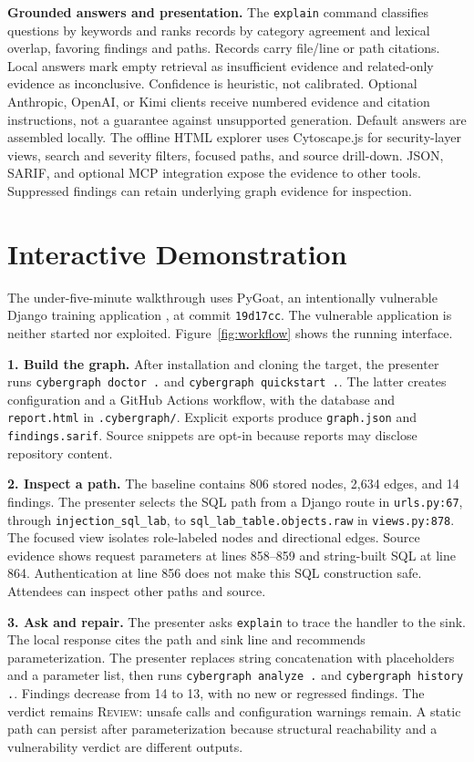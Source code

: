 \documentclass[letterpaper]{article}
\begin{document}
\textbf{Grounded answers and presentation.}
The \texttt{explain} command classifies questions by keywords and ranks records
by category agreement and lexical overlap, favoring findings and paths.
Records carry file/line or path citations. Local answers mark empty retrieval
as insufficient evidence and related-only evidence as inconclusive. Confidence
is heuristic, not calibrated. Optional Anthropic, OpenAI, or Kimi clients
receive numbered evidence and citation instructions, not a guarantee against
unsupported generation. Default answers are assembled locally.
The offline HTML explorer uses Cytoscape.js \citep{franz2016} for security-layer
views, search and severity filters, focused paths, and source drill-down.
JSON, SARIF, and optional MCP integration expose the evidence to other tools.
Suppressed findings can retain underlying graph evidence for inspection.

\section{Interactive Demonstration}
The under-five-minute walkthrough uses PyGoat, an intentionally vulnerable
Django training application \citep{pygoat}, at commit \texttt{19d17cc}.
The vulnerable application is neither started nor exploited.
Figure~\ref{fig:workflow} shows the running interface.

\textbf{1. Build the graph.}
After installation and cloning the target, the presenter runs
\texttt{cybergraph doctor .} and \texttt{cybergraph quickstart .}.
The latter creates configuration and a GitHub Actions workflow,
with the database and \texttt{report.html} in \texttt{.cybergraph/}.
Explicit exports produce \texttt{graph.json} and \texttt{findings.sarif}.
Source snippets are opt-in because reports may disclose repository content.

\textbf{2. Inspect a path.}
The baseline contains 806 stored nodes, 2,634 edges, and 14 findings.
The presenter selects the SQL path from a Django route
in \texttt{urls.py:67}, through \texttt{injection\_sql\_lab}, to
\texttt{sql\_lab\_table.}\allowbreak\texttt{objects.raw} in \texttt{views.py:878}.
The focused view isolates role-labeled nodes and directional edges. Source
evidence shows request parameters at lines
858--859 and string-built SQL at line 864. Authentication at line 856 does not
make this SQL construction safe. Attendees can inspect other paths and source.

\textbf{3. Ask and repair.}
The presenter asks \texttt{explain} to trace the handler to the sink.
The local response cites the path and sink line and recommends parameterization.
The presenter replaces string concatenation with placeholders and a parameter
list, then runs
\texttt{cybergraph analyze .} and \texttt{cybergraph history .}.
Findings decrease from 14 to 13, with no new or regressed findings.
The verdict remains \mbox{\textsc{Review}}: unsafe calls and configuration
warnings remain. A static path can persist after parameterization because
structural reachability and a vulnerability verdict are different outputs.
\end{document}
